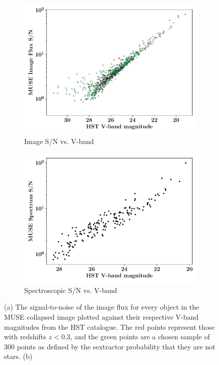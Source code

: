 \documentclass[12pt, onecolumn]{revtex4}    %
\begin{document}
\begin{figure}
  \begin{subfigure}[b]{0.495\textwidth}
    \includegraphics[width=\textwidth]{data/image_sn_vs_vband}
    \captionsetup{justification=justified}
    \caption{Image S/N vs. V-band}
    \label{fig:image_sn_vband}
  \end{subfigure}
  \begin{subfigure}[b]{0.495\textwidth}
    \includegraphics[width=\textwidth]{data/sn_vs_vband}
    \captionsetup{justification=justified}    
    \caption{Spectroscopic S/N vs. V-band}
    \label{fig:spec_sn_vband}
  \end{subfigure}
  \captionsetup{justification=justified}
  \caption[HUDF Objects]{(a) The signal-to-noise of the image flux for every object in the MUSE collapsed image plotted against their respective V-band magnitudes from the HST catalogue. The red points represent those with redshifts $z<0.3$, and the green points are a chosen sample of 300 points as defined by the sextractor probability that they are not stars. (b)}
\end{figure}
\end{document}
